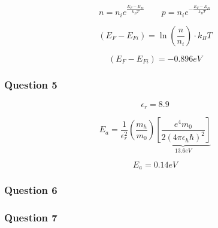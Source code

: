 $$n = n_i e^{\frac{E_F-E_{Fi}}{k_BT}}  \qquad p = n_i e^{-\frac{E_F-E_{Fi}}{k_BT}}$$

$$(E_F-E_{Fi}) = \ln\left( \frac{n}{n_i} \right) \cdot k_BT$$

$$(E_F-E_{Fi}) = -0.896 eV $$

\subsubsection*{Question 5}

$$\epsilon_r = 8.9$$


$$
E_a = \frac{1}{\epsilon_r^2} \left(\frac{m_h}{m_0}\right) \underbrace{\left[\frac{e^4m_0}{2(4\pi\epsilon_h\hbar)^2}\right]}_{13.6eV}
$$

$$E_a =  0.14eV$$

\subsubsection*{Question 6}

\subsubsection*{Question 7}